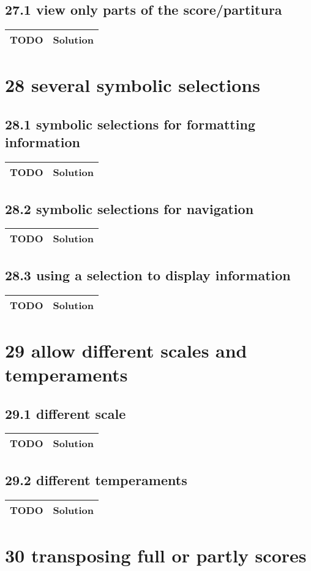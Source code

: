  \subsection*{27.1 view only parts of the score/partitura}
 \begin{tabular}{|p{}|p{}|}
 \hline
 \textbf{TODO} &
 \textbf{Solution} 
\\
 \hline
 \end{tabular} \section*{28 several symbolic selections}
 \subsection*{28.1 symbolic selections for formatting information}
 \begin{tabular}{|p{}|p{}|}
 \hline
 \textbf{TODO} &
 \textbf{Solution} 
\\
 \hline
 \end{tabular} \subsection*{28.2 symbolic selections for navigation}
 \begin{tabular}{|p{}|p{}|}
 \hline
 \textbf{TODO} &
 \textbf{Solution} 
\\
 \hline
 \end{tabular} \subsection*{28.3 using a selection to display information}
 \begin{tabular}{|p{}|p{}|}
 \hline
 \textbf{TODO} &
 \textbf{Solution} 
\\
 \hline
 \end{tabular} \section*{29 allow different scales and temperaments}
 \subsection*{29.1 different scale}
 \begin{tabular}{|p{}|p{}|}
 \hline
 \textbf{TODO} &
 \textbf{Solution} 
\\
 \hline
 \end{tabular} \subsection*{29.2 different temperaments}
 \begin{tabular}{|p{}|p{}|}
 \hline
 \textbf{TODO} &
 \textbf{Solution} 
\\
 \hline
 \end{tabular} \section*{30 transposing full or partly scores}

